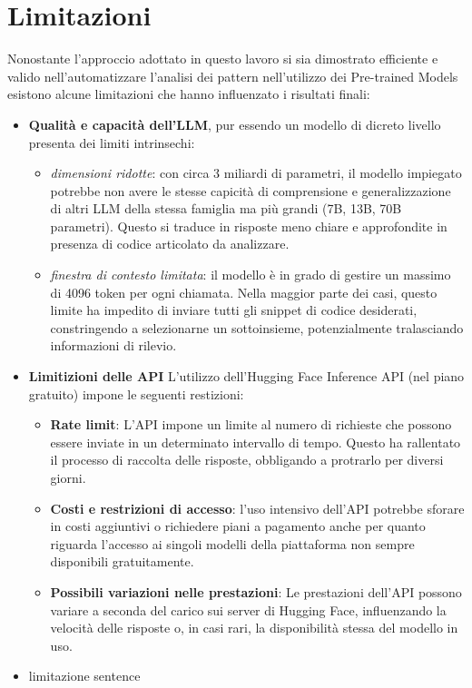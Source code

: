 \documentclass{article}
\begin{document}
\section{Limitazioni}
Nonostante l'approccio adottato in questo lavoro si sia dimostrato efficiente e valido nell'automatizzare l'analisi dei pattern nell'utilizzo dei Pre-trained Models esistono alcune limitazioni che hanno influenzato i risultati finali:
\begin{itemize}
    \item \textbf{Qualità e capacità dell'LLM}, pur essendo un modello di dicreto livello presenta dei limiti intrinsechi:
    \begin{itemize}
        \item \textit{dimensioni ridotte}: con circa 3 miliardi di parametri, il modello impiegato potrebbe non avere le stesse capicità di comprensione e generalizzazione di altri LLM della stessa famiglia ma più grandi (7B, 13B, 70B parametri). Questo si traduce in risposte meno chiare e approfondite in presenza di codice articolato da analizzare.
        \item \textit{finestra di contesto limitata}: il modello è in grado di gestire un massimo di 4096 token per ogni chiamata. Nella maggior parte dei casi, questo limite ha impedito di inviare tutti gli snippet di codice desiderati, constringendo a selezionarne un sottoinsieme, potenzialmente tralasciando informazioni di rilevio.
    \end{itemize}

    \item \textbf{Limitizioni delle API}
    L'utilizzo dell’Hugging Face Inference API (nel piano gratuito) impone le seguenti restizioni:
    \begin{itemize}
        \item \textbf{Rate limit}: L’API impone un limite al numero di richieste che possono essere inviate in un determinato intervallo di tempo. Questo ha rallentato il processo di raccolta delle risposte, obbligando a protrarlo per diversi giorni. 
        \item \textbf{Costi e restrizioni di accesso}: l'uso intensivo dell'API potrebbe sforare in costi aggiuntivi o richiedere piani a pagamento anche per quanto riguarda l'accesso ai singoli modelli della piattaforma non sempre disponibili gratuitamente.
        \item \textbf{Possibili variazioni nelle prestazioni}: Le prestazioni dell’API possono variare a seconda del carico sui server di Hugging Face, influenzando la velocità delle risposte o, in casi rari, la disponibilità stessa del modello in uso.
    \end{itemize}

    \item limitazione sentence
\end{itemize}
\end{document}
